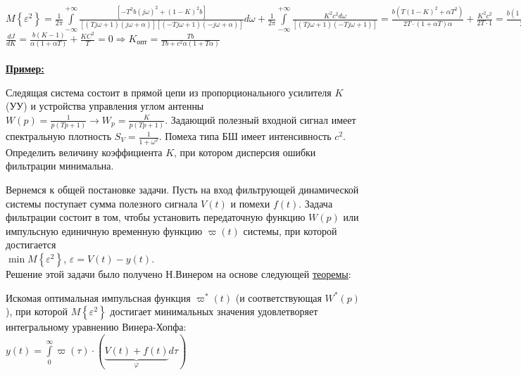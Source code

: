 \documentclass[preprint,russian,a5paper,10pt,twoside,mediummath]{ncc}
\newcommand{\ExampleMy}{\vspace{\baselineskip}\textbf{\underline{Пример:}}\nopagebreak\par}
\begin{document}
$M\left\{ {{\varepsilon }^{2}} \right\}=\frac{1}{2\pi }\int\limits_{-\infty }^{+\infty }{\frac{\left[ -{{T}^{2}}b{{\left( j\omega  \right)}^{2}}+{{\left( 1-K \right)}^{2}}b \right]}{\left[ \left( Tj\omega +1 \right)\left( j\omega +\alpha  \right) \right]\left[ \left( -Tj\omega +1 \right)\left( -j\omega +\alpha  \right) \right]}}d\omega +\frac{1}{2\pi }\int\limits_{-\infty }^{+\infty }{\frac{{{K}^{2}}{{c}^{2}}d\omega }{\left[ \left( Tj\omega +1 \right)\left( -Tj\omega +1 \right) \right]}}=\frac{b\left( T{{\left( 1-K \right)}^{2}}+\alpha {{T}^{2}} \right)}{2T\cdot \left( 1+\alpha T \right)\alpha }+\frac{{{K}^{2}}{{c}^{2}}}{2T\cdot 1}=\frac{b\left( 1+T\alpha -2K+{{K}^{2}} \right)}{2\alpha \cdot \left( 1+\alpha T \right)}+\frac{{{K}^{2}}{{c}^{2}}}{2T}$
\\$\frac{dJ}{dK}=\frac{b\left( K-1 \right)}{\alpha \left( 1+\alpha T \right)}+\frac{K{{C}^{2}}}{T}=0\Rightarrow K_{\textit{опт}}=\frac{Tb}{Tb+{{c}^{2}}\alpha \left( 1+T\alpha  \right)}$
\\\\\ExampleMy Следящая система состоит в прямой цепи из пропорционального усилителя $K$ (УУ) и устройства управления углом антенны $W\left( p \right)=\frac{1}{p\left( Tp+1 \right)}\to {{W}_{p}}=\frac{K}{p\left( Tp+1 \right)}$. Задающий полезный входной сигнал имеет спектральную плотность ${{S}_{V}}=\frac{1}{1+{{\omega }^{2}}}$. Помеха типа БШ имеет интенсивность ${{c}^{2}}$. Определить величину коэффициента $K$, при котором дисперсия ошибки фильтрации минимальна. 
\par Вернемся к общей постановке задачи. Пусть на вход фильтрующей динамической системы поступает сумма полезного сигнала $V\left( t \right)$ и помехи $f\left( t \right)$. Задача фильтрации состоит в том, чтобы установить передаточную функцию $W\left( p \right)$ или импульсную единичную временную функцию $\varpi \left( t \right)$ системы, при которой достигается 
\\$\min M\left\{ {{\varepsilon }^{2}} \right\}$, $\varepsilon =V\left( t \right)-y\left( t \right)$. 
\\Решение этой задачи было получено Н.Винером на основе следующей \underline{теоремы}:
\par Искомая оптимальная импульсная функция ${{\varpi }^{*}}\left( t \right)$ (и соответствующая 
 ${{W}^{*}}\left( p \right)$), при которой $M\left\{ {{\varepsilon }^{2}} \right\}$ достигает минимальных значения удовлетворяет интегральному уравнению Винера-Хопфа: $y\left( t \right)=\int\limits_{0}^{\infty }{\varpi \left( \tau  \right)}\cdot \left( \underbrace{V\left( t \right)+f\left( t \right)}_{\varphi }d\tau  \right)$  
\end{document}
